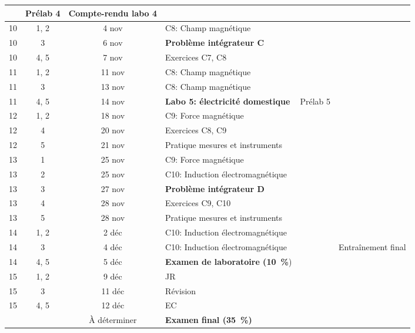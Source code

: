 \documentclass[10pt]{article}
\begin{document}
\begin{longtable}{cccp{6cm}lp{9cm}}
    &  Prélab 4  &  Compte-rendu labo 4 \\
  \midrule
  10    &  1, 2  &  4 nov    &  C8: Champ magnétique  \\*
  10    &  3     &  6 nov    &  \textbf{Problème intégrateur C} &   &    \\*
  10    &  4, 5  &  7 nov    &  Exercices C7, C8
    &    &   \\
  \midrule
  11    &  1, 2  &  11 nov   &  C8: Champ magnétique  \\
  11    &  3     &  13 nov   &  C8: Champ magnétique  \\
  11    &  4, 5  &  14 nov   &  \textbf{Labo 5: électricité domestique}
    &  Prélab 5  &    \\
  \midrule
  12    &  1, 2  &  18 nov   &  C9: Force magnétique  \\
  12    &  4     &  20 nov   &  Exercices C8, C9  &  &  \\
  12    &  5     &  21 nov   &  Pratique mesures et instruments  &  &  \\
  \midrule
  13    &  1     &  25 nov   &  C9: Force magnétique  \\
  13    &  2     &  25 nov   &  C10: Induction électromagnétique  \\
  13    &  3     &  27 nov   &  \textbf{Problème intégrateur D}  \\
  13    &  4     &  28 nov   &  Exercices C9, C10  \\
  13    &  5     &  28 nov   &  Pratique mesures et instruments  &  &  \\
  \midrule
  14    &  1, 2  &  2 déc    &  C10: Induction électromagnétique  \\
  14    &  3     &  4 déc    &  C10: Induction électromagnétique &  &  Entraînement final  \\
  14    &  4, 5  &  5 déc    &  \textbf{Examen de laboratoire (\qty{10}{\percent}})
    &    &   \\
  \midrule
  15    &  1, 2  &  9 déc    &  JR \\
  15    &  3     &  11 déc   &  Révision   \\
  15    &  4, 5  &  12 déc   &  EC
    &    &   \\
        &        & À déterminer  &  \textbf{Examen final (\qty{35}{\percent})}  \\
  \bottomrule
\end{longtable}
\end{document}
